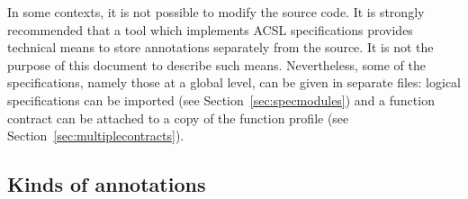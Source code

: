 In some contexts, it is not possible to modify the source code.
It is strongly recommended that a tool which implements
ACSL specifications provides technical means to store annotations
separately from the source. It is not the purpose of this document
to describe such means.  Nevertheless, some of the specifications,
namely those at a global level, can be given in separate files:
logical specifications can be imported (see
Section~\ref{sec:specmodules}) and a function contract can be attached
to a copy of the function profile (see
Section~\ref{sec:multiplecontracts}).








\subsection{Kinds of annotations}

